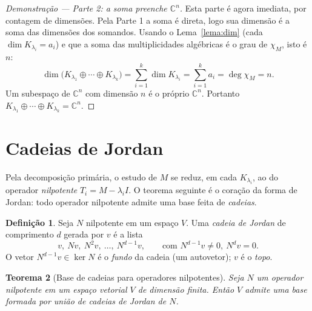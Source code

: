 \documentclass[11pt,a4paper]{amsart}
\newcommand{\C}{\mathbb{C}}
\theoremstyle{plain}
\newtheorem{teorema}{Teorema}[section]
\theoremstyle{definition}
\newtheorem{definicao}[teorema]{Definição}
\theoremstyle{remark}
\begin{document}
\begin{proof}[Demonstra\c{c}\~ao --- Parte 2: a soma preenche $\C^n$]
Esta parte \'e agora imediata, por contagem de dimens\~oes. Pela Parte 1 a
soma \'e direta, logo sua dimens\~ao \'e a soma das dimens\~oes dos somandos.
Usando o Lema~\ref{lema:dim} (cada $\dim K_{\lambda_i}=a_i$) e que a soma das
multiplicidades alg\'ebricas \'e o grau de $\chi_M$, isto \'e $n$:
\[
  \dim\big(K_{\lambda_1}\oplus\cdots\oplus K_{\lambda_k}\big)
  = \sum_{i=1}^{k}\dim K_{\lambda_i}
  = \sum_{i=1}^{k} a_i
  = \deg\chi_M = n .
\]
Um subespa\c{c}o de $\C^n$ com dimens\~ao $n$ \'e o pr\'oprio $\C^n$. Portanto
$K_{\lambda_1}\oplus\cdots\oplus K_{\lambda_k}=\C^n$.
\end{proof}

\section{Cadeias de Jordan}
\label{sec:cadeias}

Pela decomposi\c{c}\~ao prim\'aria, o estudo de $M$ se reduz, em cada
$K_{\lambda_i}$, ao do operador \emph{nilpotente} $T_i=M-\lambda_i I$. O
teorema seguinte \'e o cora\c{c}\~ao da forma de Jordan: todo operador
nilpotente admite uma base feita de \emph{cadeias}.

\begin{definicao}\label{def:cadeia}
Seja $N$ nilpotente em um espa\c{c}o $V$. Uma \emph{cadeia de Jordan} de
comprimento $d$ gerada por $v$ \'e a lista
\[
  v,\ Nv,\ N^2 v,\ \dots,\ N^{d-1}v,
  \qquad\text{com } N^{d-1}v\neq 0,\ N^{d}v=0.
\]
O vetor $N^{d-1}v\in\ker N$ \'e o \emph{fundo} da cadeia (um autovetor); $v$ \'e
o \emph{topo}.
\end{definicao}

\begin{teorema}[Base de cadeias para operadores nilpotentes]\label{thm:nilp-jordan}
Seja $N$ um operador nilpotente em um espa\c{c}o vetorial $V$ de dimens\~ao
finita. Ent\~ao $V$ admite uma base formada por uni\~ao de cadeias de Jordan
de $N$.
\end{teorema}
\end{document}
